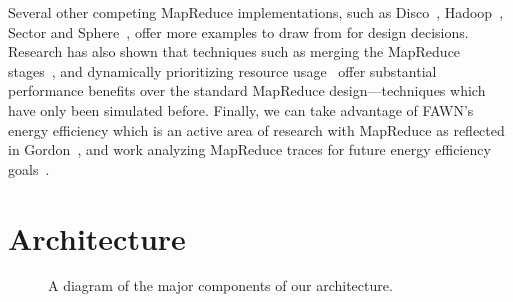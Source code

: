 \documentclass[10pt,letter,final,article,twocolumn]{article} %
\begin{document}
Several other competing MapReduce implementations, such as
Disco~\cite{disco10}, Hadoop~\cite{hadoop10}, Sector and
Sphere~\cite{sphere09}, offer more examples to draw from for design
decisions.  Research has also shown that techniques such as merging the
MapReduce stages~\cite{barrier10}, and dynamically prioritizing resource
usage~\cite{sandholm09} offer substantial performance benefits over the
standard MapReduce design---techniques which have only been simulated
before.  Finally, we can take advantage of FAWN's energy efficiency which is
an active area of research with MapReduce as reflected in
Gordon~\cite{gordon09},  and work analyzing MapReduce traces for future
energy efficiency goals~\cite{chen10}.

\section{Architecture}



\begin{figure}[htbp]
\begin{center}
\caption{A diagram of the major components of our architecture.}
\label{fig:arch}
\end{center}
\end{figure}
\end{document}
